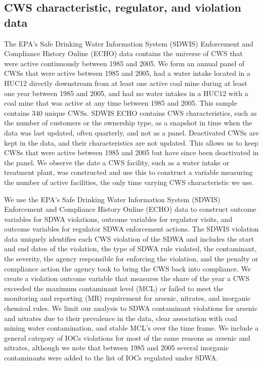 \documentclass{article}
\begin{document}
\subsection{CWS characteristic, regulator, and violation data}

The EPA's Safe Drinking Water Information System (SDWIS) Enforcement and Compliance History Online (ECHO) data contains the universe of CWS that were active continuously between 1985 and 2005. We form an annual panel of CWSs that were active between 1985 and 2005, had a water intake located in a HUC12 directly downstream from at least one active coal mine during at least one year between 1985 and 2005, and had no water intakes in a HUC12 with a coal mine that was active at any time between 1985 and 2005. This sample contains 340 unique CWSs. SDWIS ECHO contains CWS characteristics, such as the number of customers or the ownership type, as a snapshot in time when the data was last updated, often quarterly, and not as a panel. Deactivated CWSs are kept in the data, and their characteristics are not updated. This allows us to keep CWSs that were active between 1985 and 2005 but have since been deactivated in the panel. We observe the date a CWS facility, such as a water intake or treatment plant, was constructed and use this to construct a variable measuring the number of active facilities, the only time varying CWS characteristic we use.

We use the EPA's Safe Drinking Water Information System (SDWIS) Enforcement and Compliance History Online (ECHO) data to construct outcome variables for SDWA violations, outcome variables for regulator visits, and outcome variables for regulator SDWA enforcement actions. The SDWIS violation data uniquely identifies each CWS violation of the SDWA and includes the start and end dates of the violation, the type of SDWA rule violated, the contaminant, the severity, the agency responsible for enforcing the violation, and the penalty or compliance action the agency took to bring the CWS back into compliance. We create a violation outcome variable that measures the share of the year a CWS exceeded the maximum contaminant level (MCL) or failed to meet the monitoring and reporting (MR) requirement for arsenic, nitrates, and inorganic chemical rules. We limit our analysis to SDWA contaminant violations for arsenic and nitrates due to their prevalence in the data, clear association with coal mining water contamination, and stable MCL's over the time frame. We include a general category of IOCs violations for most of the same reasons as arsenic and nitrates, although we note that between 1985 and 2005 several inorganic contaminants were added to the list of IOCs regulated under SDWA.
\end{document}
